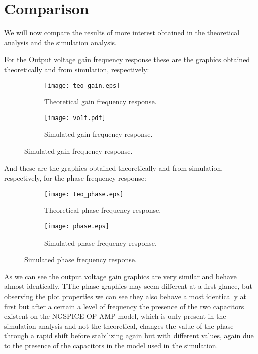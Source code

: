 \newpage
\section{Comparison}
\label{sec:comparison}
\par
We will now compare the results of more interest obtained in the theoretical analysis and the simulation analysis.\par


For the Output voltage gain frequency response these are the graphics obtained theoretically and from simulation, respectively:

\begin{figure}[!htb]
     \begin{subfigure}[b]{0.48\textwidth}
         \centering
         \texttt{[image: teo\_gain.eps]}
         \caption{Theoretical gain frequency response.}
     \end{subfigure}
     \hfill
     \begin{subfigure}[b]{0.48\textwidth}
         \centering
         \texttt{[image: vo1f.pdf]}
         \caption{Simulated gain frequency response.}
     \end{subfigure}
\end{figure}

And these are the graphics obtained theoretically and from simulation, respectively, for the phase frequency response:


\begin{figure}[H]
     \begin{subfigure}[H]{0.48\textwidth}
         \centering
         \texttt{[image: teo\_phase.eps]}
         \caption{Theoretical phase frequency response.}
     \end{subfigure}
     \hfill
     \begin{subfigure}[H]{0.48\textwidth}
         \centering
         \texttt{[image: phase.eps]}
         \caption{Simulated phase frequency response.}
     \end{subfigure}
\end{figure}

As we can see the output voltage gain graphics are very similar and behave almost identically. TThe phase graphics may seem different at a first glance, but observing the plot properties we can see they also behave almost identically at first but after a certain a level of frequency the presence of the two capacitors existent on the NGSPICE OP-AMP model, which is only present in the simulation analysis and not the theoretical, changes the value of the phase through a rapid shift before stabilizing again but with different values, again due to the presence of the capacitors in the model used in the simulation.

